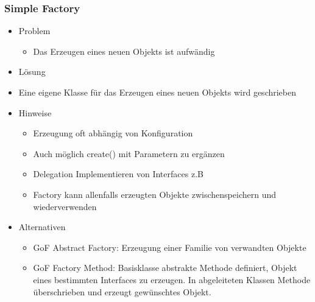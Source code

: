 \documentclass[../ZF_SWEN1.tex]{subfiles}
\begin{document}
\subsubsection{Simple Factory}
\begin{itemize}
	\item Problem
	\begin{itemize}
		\item Das Erzeugen eines neuen Objekts ist aufwändig
	\end{itemize}
	\item Lösung
		\item Eine eigene Klasse für das Erzeugen eines neuen Objekts wird geschrieben
	\item Hinweise
	\begin{itemize}
		\item Erzeugung oft abhängig von Konfiguration
		\item Auch möglich create() mit Parametern zu ergänzen
		\item Delegation Implementieren von Interfaces z.B
		\item Factory kann allenfalls erzeugten Objekte zwischenspeichern und wiederverwenden
	\end{itemize}
	\item Alternativen
	\begin{itemize}
		\item GoF Abstract Factory: Erzeugung einer Familie von verwandten Objekte
		\item GoF Factory Method: Basisklasse abstrakte Methode definiert, Objekt eines bestimmten Interfaces zu erzeugen. In abgeleiteten Klassen Methode überschrieben und erzeugt gewünschtes Objekt.
	\end{itemize}
\end{itemize}
\end{document}
